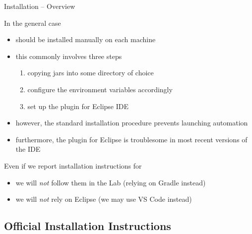 \documentclass[presentation]{beamer}\mode<presentation>{\usetheme{AMSBolognaFC}}
\begin{document}
\begin{frame}[c]{\jason{} Installation -- Overview}
    
    In the general case
    \begin{itemize}
        \item \jason{} should be installed \alert{manually} on each machine 
        
        \vfill
        
        \item this commonly involves three steps
        \begin{enumerate}
            \item copying \jason{} jars into some directory of choice
            \item configure the environment variables accordingly
            \item set up the \jason{} plugin for Eclipse IDE
        \end{enumerate}
        
        \vfill
        
        \item however, the standard installation procedure prevents \jason{} launching automation
        
        \vfill
        
        \item furthermore, the \jason{} plugin for Eclipse is troublesome in most recent versions of the IDE
        
    \end{itemize}
    
    \vfill
    
    \begin{alertblock}{Even if we report installation instructions for \jason{}}
        \begin{itemize}
            \item we will \emph{not} follow them in the Lab (relying on Gradle instead)

            \item we will \emph{not} rely on Eclipse (we may use VS Code instead)
        \end{itemize}
    \end{alertblock}
        
\end{frame}

\subsection{Official Installation Instructions}
\end{document}
